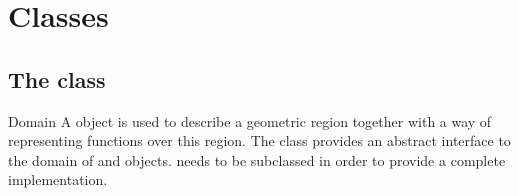 \section{\escript Classes}

\subsection{The \Domain class}
\begin{classdesc}{Domain}{}
A \Domain object is used to describe a geometric region together with
a way of representing functions over this region.
The \Domain class provides an abstract interface to the domain of \FunctionSpace and \Data objects.
\Domain needs to be subclassed in order to provide a complete implementation.
\end{classdesc}

